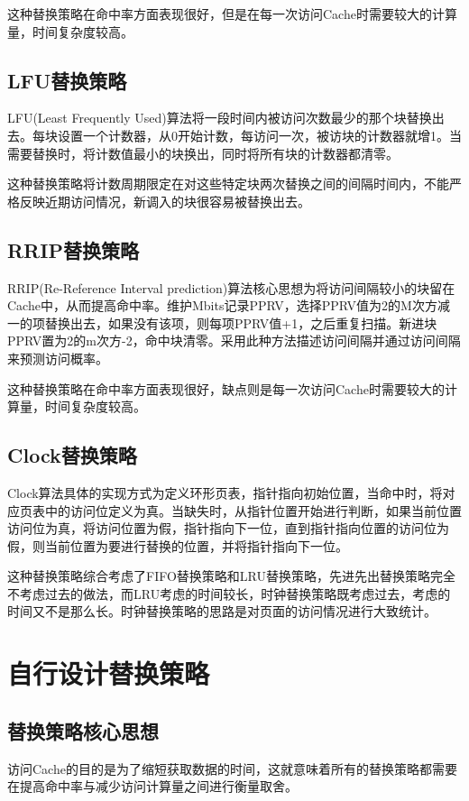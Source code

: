 \documentclass{article}
\begin{document}
这种替换策略在命中率方面表现很好，但是在每一次访问Cache时需要较大的计算量，时间复杂度较高。

\subsection{LFU替换策略}
LFU(Least Frequently Used)算法将一段时间内被访问次数最少的那个块替换出去。每块设置一个计数器，从0开始计数，每访问一次，被访块的计数器就增1。当需要替换时，将计数值最小的块换出，同时将所有块的计数器都清零。

这种替换策略将计数周期限定在对这些特定块两次替换之间的间隔时间内，不能严格反映近期访问情况，新调入的块很容易被替换出去。

\subsection{RRIP替换策略}
RRIP(Re-Reference Interval prediction)算法核心思想为将访问间隔较小的块留在Cache中，从而提高命中率。维护Mbits记录PPRV，选择PPRV值为2的M次方减一的项替换出去，如果没有该项，则每项PPRV值+1，之后重复扫描。新进块PPRV置为2的m次方-2，命中块清零。采用此种方法描述访问间隔并通过访问间隔来预测访问概率。

这种替换策略在命中率方面表现很好，缺点则是每一次访问Cache时需要较大的计算量，时间复杂度较高。

\subsection{Clock替换策略}
Clock算法具体的实现方式为定义环形页表，指针指向初始位置，当命中时，将对应页表中的访问位定义为真。当缺失时，从指针位置开始进行判断，如果当前位置访问位为真，将访问位置为假，指针指向下一位，直到指针指向位置的访问位为假，则当前位置为要进行替换的位置，并将指针指向下一位。

这种替换策略综合考虑了FIFO替换策略和LRU替换策略，先进先出替换策略完全不考虑过去的做法，而LRU考虑的时间较长，时钟替换策略既考虑过去，考虑的时间又不是那么长。时钟替换策略的思路是对页面的访问情况进行大致统计。

\section{自行设计替换策略}
\subsection{替换策略核心思想}
访问Cache的目的是为了缩短获取数据的时间，这就意味着所有的替换策略都需要在提高命中率与减少访问计算量之间进行衡量取舍。
\end{document}
